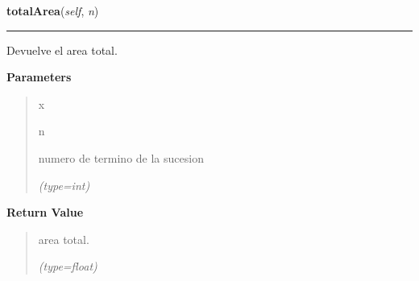 \hspace{.8\funcindent}\begin{boxedminipage}{\funcwidth}

    \raggedright \textbf{totalArea}(\textit{self}, \textit{n})

    \vspace{-1.5ex}

    \rule{\textwidth}{0.5\fboxrule}
\setlength{\parskip}{2ex}
    Devuelve el area total.

\setlength{\parskip}{1ex}
      \textbf{Parameters}
      \vspace{-1ex}

      \begin{quote}
        \begin{Ventry}{x}

          \item[n]

          numero de termino de la sucesion

            {\it (type=int)}

        \end{Ventry}

      \end{quote}

      \textbf{Return Value}
    \vspace{-1ex}

      \begin{quote}
      area total.

      {\it (type=float)}

      \end{quote}

    \end{boxedminipage}

    \label{FractalZE:sierpinsky:Sierpinsky:totalPerimeter}

    \vspace{0.5ex}

